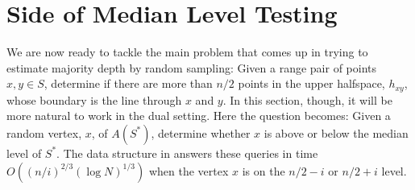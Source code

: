 \documentclass{cccg12}
\newcommand{\eps}{\varepsilon}
\begin{document}
%
%

\section{Side of Median Level Testing}

We are now ready to tackle the main problem that comes up in trying
to estimate majority depth by random sampling:  Given a range pair of
points $x,y\in S$, determine if there are more than $n/2$ points in
the upper halfspace, $h_{xy}$, whose boundary is the line through $x$
and $y$.  In this section, though, it will be more natural to work in
the dual setting.  Here the question becomes: Given a random vertex,
$x$, of $A(S^*)$, determine whether $x$ is above or below the median
level of $S^*$.  The data structure in  answers these
queries in time $O((n/i)^{2/3}(\log N)^{1/3})$ when the vertex $x$ is on the
$n/2-i$ or $n/2+i$ level.
\end{document}
